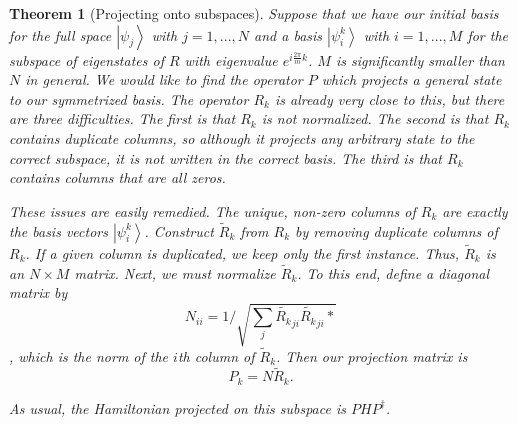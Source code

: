 \documentclass{article}
\newcommand{\ket}[1]{\left| #1 \right>} %
\newcommand{\braket}[2]{\left< #1 \vphantom{#2} \right|
 \left. #2 \vphantom{#1} \right>} %
\newtheorem{theorem}{Theorem}[section]
\theoremstyle{definition}
\begin{document}

\begin{theorem}[Projecting onto subspaces]
\label{proj}
Suppose that we have our initial basis for the full space $\ket{\psi_j}$ with $j = 1,...,N$ and a basis $\ket{\psi^k_i}$ with $i = 1,...,M$ for the subspace of eigenstates of $R$ with eigenvalue $e^{i \frac{2\pi}{m}k}$. $M$ is significantly smaller than $N$ in general. We would like to find the operator $P$ which projects a general state to our symmetrized basis. The operator $R_k$ is already very close to this, but there are three difficulties. The first is that $R_k$ is not normalized. The second is that $R_k$ contains duplicate columns, so although it projects any arbitrary state to the correct subspace, it is not written in the correct basis. The third is that $R_k$ contains columns that are all zeros.

These issues are easily remedied. The unique, non-zero columns of $R_k$ are exactly the basis vectors $\ket{\psi^k_i}$. Construct $\tilde{R}_k$ from $R_k$ by removing duplicate columns of $R_k$. If a given column is duplicated, we keep only the first instance. Thus, $\tilde{R}_k$ is an $N \times M$ matrix. Next, we must normalize $\tilde{R}_k$. To this end, define a diagonal matrix by 
\begin{equation}
N_{ii} = 1/\sqrt{\sum_j \tilde{R_k}_{ji} \tilde{R_k}_{ji}*}
\end{equation}
, which is the norm of the $i$th column of $\tilde{R}_k$. Then our projection matrix is
\begin{equation}
P_k = N \tilde{R}_k.
\end{equation}

As usual, the Hamiltonian projected on this subspace is $P H P^\dag$.

\end{theorem}
\end{document}
